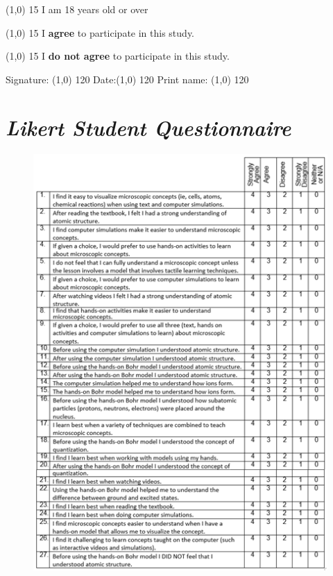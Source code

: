 \documentclass[11pt]{sig-alternate}
\begin{document}
\begin{large}
\line(1,0) {15} I am 18 years old or over

\line(1,0) {15} I \textbf{agree} to participate in this study.

\line(1,0) {15} I \textbf{do not agree} to participate in this study.


Signature: \line(1,0) {120}	
Date:\line(1,0) {120}
Print name: \line(1,0) {120}	

\section*{\textit{Likert Student Questionnaire}}
\begin{figure}[htp]
    \centering
    \includegraphics[width=14.5cm]{table1.png}

\end{figure}
\end{large}
\end{document}
